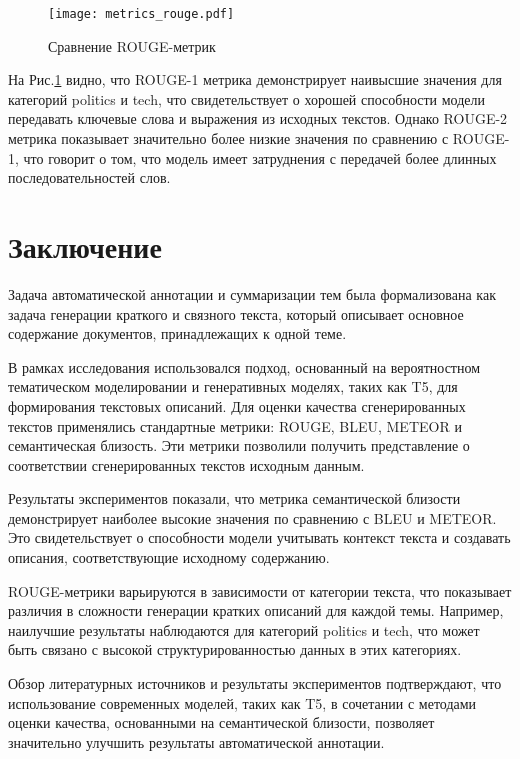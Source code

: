 \documentclass{article}
\begin{document}
 \begin{figure}[!htb]
    \centering
    \texttt{[image: metrics\_rouge.pdf]}
    \caption{Сравнение ROUGE-метрик}
    \label{fig:2}
\end{figure}


На Рис.\ref{fig:2} видно, что ROUGE-1 метрика демонстрирует наивысшие значения для категорий politics и tech, что свидетельствует о хорошей способности модели передавать ключевые слова и выражения из исходных текстов. Однако ROUGE-2 метрика показывает значительно более низкие значения по сравнению с ROUGE-1, что говорит о том, что модель имеет затруднения с передачей более длинных последовательностей слов.


\section{Заключение}

Задача автоматической аннотации и суммаризации тем была формализована как задача генерации краткого и связного текста, который описывает основное содержание документов, принадлежащих к одной теме. 

В рамках исследования использовался подход, основанный на вероятностном тематическом моделировании и генеративных моделях, таких как T5, для формирования текстовых описаний. Для оценки качества сгенерированных текстов применялись стандартные метрики: ROUGE, BLEU, METEOR и семантическая близость. Эти метрики позволили получить представление о соответствии сгенерированных текстов исходным данным.

Результаты экспериментов показали, что метрика семантической близости демонстрирует наиболее высокие значения по сравнению с BLEU и METEOR. Это свидетельствует о способности модели учитывать контекст текста и создавать описания, соответствующие исходному содержанию. 

ROUGE-метрики варьируются в зависимости от категории текста, что показывает различия в сложности генерации кратких описаний для каждой темы. Например, наилучшие результаты наблюдаются для категорий politics и tech, что может быть связано с высокой структурированностью данных в этих категориях.

Обзор литературных источников и результаты экспериментов подтверждают, что использование современных моделей, таких как T5, в сочетании с методами оценки качества, основанными на семантической близости, позволяет значительно улучшить результаты автоматической аннотации. 


\printbibliography
\end{document}
